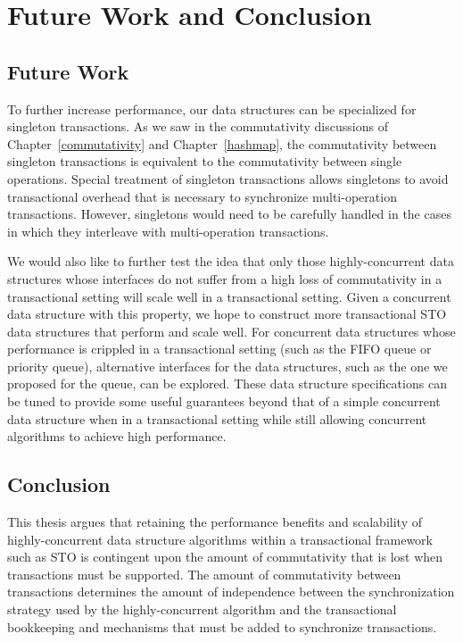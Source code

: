\chapter{Future Work and Conclusion}

\section{Future Work}
To further increase performance, our data structures can be specialized for singleton transactions. As we saw in the commutativity discussions of Chapter~\ref{commutativity} and Chapter~\ref{hashmap}, the commutativity between singleton transactions is equivalent to the commutativity between single operations. Special treatment of singleton transactions allows singletons to avoid transactional overhead that is necessary to synchronize multi-operation transactions. However, singletons would need to be carefully handled in the cases in which they interleave with multi-operation transactions. 

We would also like to further test the idea that only those highly-concurrent data structures whose interfaces do not suffer from a high loss of commutativity in a transactional setting will scale well in a transactional setting. Given a concurrent data structure with this property, we hope to construct more transactional STO data structures that perform and scale well.
For concurrent data structures whose performance is crippled in a transactional setting (such as the FIFO queue or priority queue), alternative interfaces for the data structures, such as the one we proposed for the queue, can be explored. These data structure specifications can be tuned to provide some useful guarantees beyond that of a simple concurrent data structure when in a transactional setting while still allowing concurrent algorithms to achieve high performance.

\section{Conclusion}
This thesis argues that retaining the performance benefits and scalability of highly-concurrent data structure algorithms within a transactional framework such as STO is contingent upon the amount of commutativity that is lost when transactions must be supported. The amount of commutativity between transactions determines the amount of independence between the synchronization strategy used by the highly-concurrent algorithm and the transactional bookkeeping and mechanisms that must be added to synchronize transactions.

